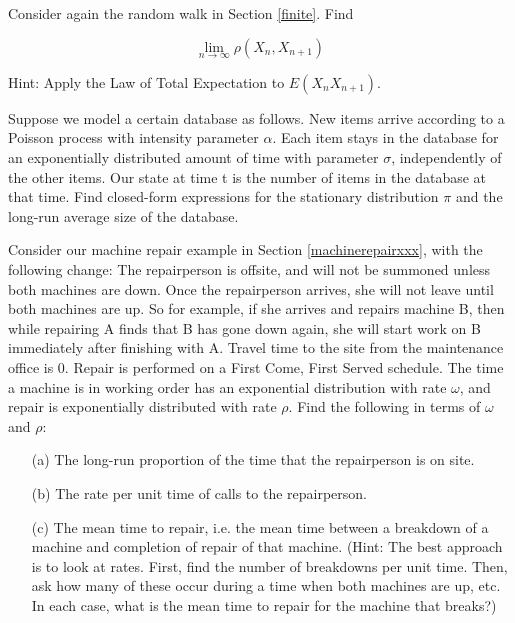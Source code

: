 \oneproblem
Consider again the random walk in Section \ref{finite}.  Find

\begin{equation}
\lim_{n \rightarrow \infty} \rho(X_n,X_{n+1})
\end{equation}

Hint:  Apply the Law of Total Expectation to $E(X_n X_{n+1})$.


\oneproblem
Suppose we model a certain database as follows. New items arrive
according to a Poisson process with intensity parameter $\alpha$. Each item
stays in the database for an exponentially distributed amount of time
with parameter $\sigma$, independently of the other items. Our state at time t
is the number of items in the database at that time. Find closed-form
expressions for the stationary distribution $\pi$ and the long-run average
size of the database.

\oneproblem Consider our machine repair example in Section
\ref{machinerepairxxx}, with the following change: The repairperson is
offsite, and will not be summoned unless both machines are down. Once
the repairperson arrives, she will not leave until both machines are up.
So for example, if she arrives and repairs machine B, then while
repairing A finds that B has gone down again, she will start work on B
immediately after finishing with A. Travel time to the site from the
maintenance office is 0. Repair is performed on a First Come, First
Served schedule.  The time a machine is in working order has an
exponential distribution with rate $\omega$, and repair is exponentially
distributed with rate $\rho$. Find the following in terms of $\omega$
and $\rho$:

\begin{itemize}

\item [(a)] The long-run proportion of the time that the repairperson is
on site.

\item [(b)] The rate per unit time of calls to the repairperson.

\item [(c)] The mean time to repair, i.e. the mean time between a
breakdown of a machine and completion of repair of that machine. (Hint:
The best approach is to look at rates. First, find the number of
breakdowns per unit time. Then, ask how many of these occur during a
time when both machines are up, etc. In each case, what is the mean time
to repair for the machine that breaks?) 

\end{itemize}

